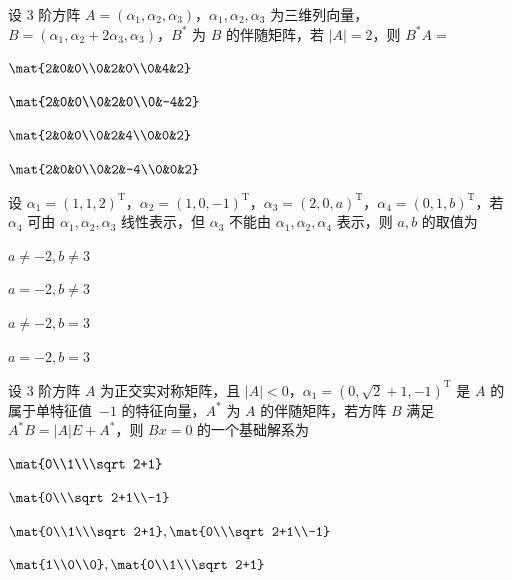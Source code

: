 \begin{question}[index=5]
设 $3$ 阶方阵 $A=(\alpha_1,\alpha_2,\alpha_3)$，$\alpha_1,\alpha_2,\alpha_3$ 为三维列向量，$B=(\alpha_1,\alpha_2+2\alpha_3,\alpha_3)$，$B^*$ 为 $B$ 的伴随矩阵，若 $|A|=2$，则 $B^*A=$
\begin{choices}[columns=4]
\item $\mat{2&0&0\\0&2&0\\0&4&2}$
\item $\mat{2&0&0\\0&2&0\\0&-4&2}$
\item $\mat{2&0&0\\0&2&4\\0&0&2}$
\item $\mat{2&0&0\\0&2&-4\\0&0&2}$
\end{choices}
\end{question}
\QuestionBreak

\begin{question}[index=6]
设 $\alpha_1=(1,1,2)^{\mathrm T}$，$\alpha_2=(1,0,-1)^{\mathrm T}$，$\alpha_3=(2,0,a)^{\mathrm T}$，$\alpha_4=(0,1,b)^{\mathrm T}$，若 $\alpha_4$ 可由 $\alpha_1,\alpha_2,\alpha_3$ \allowbreak\mbox{线性表示}，但 $\alpha_3$ 不能由 $\alpha_1,\alpha_2,\alpha_4$ 表示，则 $a,b$ 的取值为
\begin{choices}[columns=4]
\item $a\ne-2,b\ne3$
\item $a=-2,b\ne3$
\item $a\ne-2,b=3$
\item $a=-2,b=3$
\end{choices}
\end{question}
\QuestionBreak

\begin{question}[index=7]
设 $3$ 阶方阵 $A$ 为正交实对称矩阵，且 $|A|<0$，$\alpha_1=(0,\sqrt2+1,-1)^{\mathrm T}$ 是 $A$ 的属于\allowbreak\mbox{单特征值 $-1$} 的特征向量，$A^*$ 为 $A$ 的伴随矩阵，若方阵 $B$ 满足 $A^*B=|A|E+A^*$，则 $Bx=0$ 的一个\allowbreak\mbox{基础解系}为
\begin{choices}[columns=2]
\item $\mat{0\\1\\\sqrt2+1}$
\item $\mat{0\\\sqrt2+1\\-1}$
\item $\mat{0\\1\\\sqrt2+1},\mat{0\\\sqrt2+1\\-1}$
\item $\mat{1\\0\\0},\mat{0\\1\\\sqrt2+1}$
\end{choices}
\end{question}
\QuestionBreak

